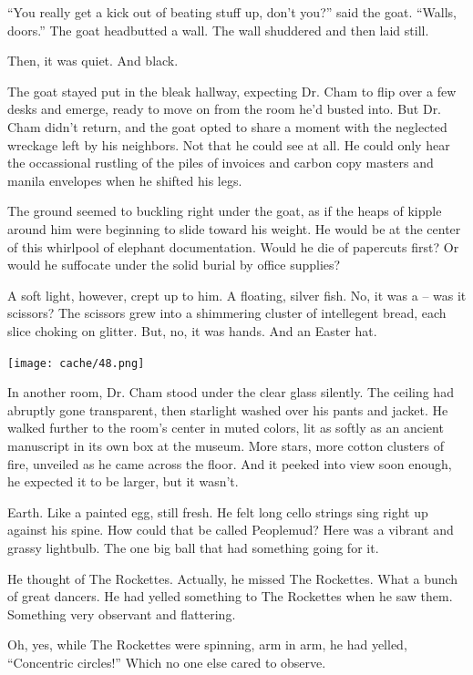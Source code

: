 \documentclass[12pt,twoside]{report}
\begin{document}
``You really get a kick out of beating stuff up, don't you?'' said the
goat.  ``Walls, doors.'' The goat headbutted a wall.  The wall
shuddered and then laid still.

Then, it was quiet.  And black.

The goat stayed put in the bleak hallway, expecting Dr. Cham to flip
over a few desks and emerge, ready to move on from the room he'd
busted into.  But Dr. Cham didn't return, and the goat opted to share
a moment with the neglected wreckage left by his neighbors.  Not that
he could see at all. He could only hear the occassional rustling of
the piles of invoices and carbon copy masters and manila envelopes
when he shifted his legs.

The ground seemed to buckling right under the goat, as if the heaps of
kipple around him were beginning to slide toward his weight.  He would
be at the center of this whirlpool of elephant documentation.  Would
he die of papercuts first?  Or would he suffocate under the solid
burial by office supplies?

A soft light, however, crept up to him.  A floating, silver fish.  No,
it was a -- was it scissors? The scissors grew into a shimmering
cluster of intellegent bread, each slice choking on glitter. But, no,
it was hands.  And an Easter hat.

	\texttt{[image: cache/48.png]}

In another room, Dr. Cham stood under the clear glass silently.  The
ceiling had abruptly gone transparent, then starlight washed over his
pants and jacket.  He walked further to the room's center in muted
colors, lit as softly as an ancient manuscript in its own box at the
museum.  More stars, more cotton clusters of fire, unveiled as he came
across the floor. And it peeked into view soon enough, he expected it
to be larger, but it wasn't.

Earth.  Like a painted egg, still fresh.  He felt long cello strings
sing right up against his spine.  How could that be called Peoplemud?
Here was a vibrant and grassy lightbulb.  The one big ball that had
something going for it.

He thought of The Rockettes.  Actually, he missed The Rockettes.  What
a bunch of great dancers.  He had yelled something to The Rockettes
when he saw them.  Something very observant and flattering.

Oh, yes, while The Rockettes were spinning, arm in arm, he had yelled,
``Concentric circles!'' Which no one else cared to observe.
\end{document}
